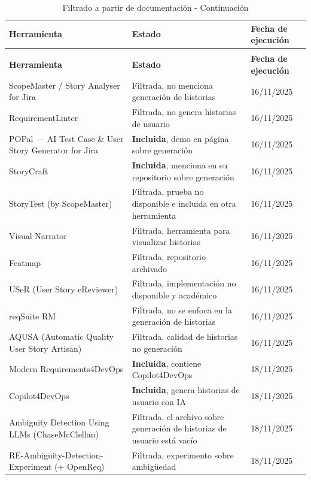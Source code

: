 \begin{center}
\begin{longtable}{|p{6.5cm}|p{4cm}|p{1.8cm}|}
\caption{Filtrado a partir de documentación}
\label{table:filtrado1} \\
\hline
\textbf{Herramienta} & \textbf{Estado} & \textbf{Fecha de ejecución} \\
\hline
\endfirsthead

\caption{Filtrado a partir de documentación - Continuación} \\
\hline
\textbf{Herramienta} & \textbf{Estado} & \textbf{Fecha de ejecución} \\
\hline
\endhead

\hline
\endfoot

\hline
\endlastfoot

ScopeMaster / Story Analyser for Jira & Filtrada, no menciona generación de historias & 16/11/2025 \\
RequirementLinter & Filtrada, no genera historias de usuario & 16/11/2025 \\
POPal --- AI Test Case \& User Story Generator for Jira & \textbf{Incluida}, demo en página sobre generación & 16/11/2025 \\
StoryCraft & \textbf{Incluida}, menciona en su repositorio sobre generación & 16/11/2025 \\
StoryTest (by ScopeMaster) & Filtrada, prueba no disponible e incluida en otra herramienta & 16/11/2025 \\
Visual Narrator & Filtrada, herramienta para visualizar historias & 16/11/2025 \\
Featmap & Filtrada, repositorio archivado & 16/11/2025 \\
USeR (User Story eReviewer) & Filtrada, implementación no disponible y académico  & 16/11/2025 \\
reqSuite RM & Filtrada, no se enfoca en la generación de historias & 16/11/2025 \\
AQUSA (Automatic Quality User Story Artisan) & Filtrada, calidad de historias no generación & 16/11/2025 \\
Modern Requirements4DevOps & \textbf{Incluida}, contiene Copilot4DevOps & 18/11/2025 \\
Copilot4DevOps & \textbf{Incluida}, genera historias de usuario con IA & 18/11/2025 \\
Ambiguity Detection Using LLMs (ChaseMcClellan) & Filtrada, el archivo sobre generación de historias de usuario está vacío & 18/11/2025 \\
RE-Ambiguity-Detection-Experiment (+ OpenReq) & Filtrada, experimento sobre ambigüedad & 18/11/2025 \\

\end{longtable}
\end{center}
